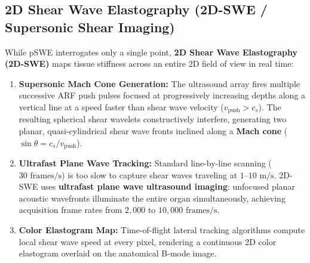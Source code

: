 \documentclass[11pt,a4paper]{article}
\begin{document}
\subsection{2D Shear Wave Elastography (2D-SWE / Supersonic Shear Imaging)}
While pSWE interrogates only a single point, \textbf{2D Shear Wave Elastography (2D-SWE)} maps tissue stiffness across an entire 2D field of view in real time:
\begin{enumerate}
    \item \textbf{Supersonic Mach Cone Generation:} The ultrasound array fires multiple successive ARF push pulses focused at progressively increasing depths along a vertical line at a speed faster than shear wave velocity ($v_{\text{push}} > c_s$). The resulting spherical shear wavelets constructively interfere, generating two planar, quasi-cylindrical shear wave fronts inclined along a \textbf{Mach cone} ($\sin \theta = c_s / v_{\text{push}}$).
    \item \textbf{Ultrafast Plane Wave Tracking:} Standard line-by-line scanning ($30\text{ frames/s}$) is too slow to capture shear waves traveling at $1\text{--}10\text{ m/s}$. 2D-SWE uses \textbf{ultrafast plane wave ultrasound imaging}: unfocused planar acoustic wavefronts illuminate the entire organ simultaneously, achieving acquisition frame rates from $2,000$ to $10,000\text{ frames/s}$.
    \item \textbf{Color Elastogram Map:} Time-of-flight lateral tracking algorithms compute local shear wave speed at every pixel, rendering a continuous 2D color elastogram overlaid on the anatomical B-mode image.
\end{enumerate}
\end{document}
